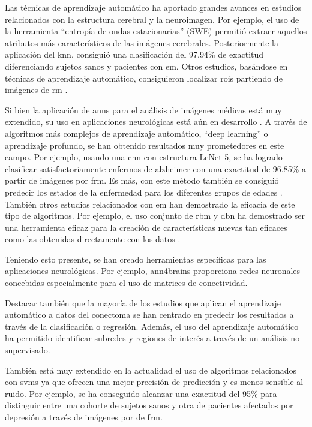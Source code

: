 Las técnicas de aprendizaje automático ha aportado grandes avances en estudios relacionados con la estructura cerebral y la neuroimagen. Por ejemplo, \cite{Zhang2016ComparisonMachine} el uso de la herramienta ``entropía de ondas estacionarias'' (SWE) permitió extraer aquellos  atributos más característicos de las imágenes cerebrales. Posteriormente la aplicación del \gls{knn}, consiguió una clasificación del 97.94\% de exactitud diferenciando sujetos sanos y pacientes con \gls{em}. Otros estudios, basándose en  técnicas de aprendizaje automático, consiguieron localizar \glspl{roi} partiendo de imágenes de \gls{rm} \cite{Desikan2006AnInterest}.

Si bien la aplicación de \glspl{ann} para el análisis de imágenes médicas está muy extendido, su uso en aplicaciones neurológicas está aún en desarrollo \cite{Ciresan2013MitosisNetworks} \cite{Ciresan2012DeepImages}. A través de algoritmos más complejos de aprendizaje automático, ``deep learning'' o aprendizaje profundo, se han obtenido resultados muy prometedores en este campo. Por ejemplo, usando una \gls{cnn} con estructura LeNet-5, se ha logrado clasificar  satisfactoriamente enfermos de alzheimer con una exactitud de 96.85\% a partir de imágenes por \gls{frm}. Es más, con este método también se consiguió predecir los estados de la enfermedad para los diferentes grupos de edades \cite{Sarraf2016ClassificationNetworks}. También otros estudios relacionados con \gls{em} han demostrado la eficacia de este tipo de algoritmos. Por ejemplo, el uso conjunto de \gls{rbm} y \gls{dbn}  ha demostrado ser una herramienta eficaz para la creación de características nuevas tan eficaces como las obtenidas directamente con los datos \cite{Yoo2014DeepSegmentation}.


Teniendo esto presente, se han creado herramientas específicas para las aplicaciones neurológicas. Por ejemplo, ann4brains \cite{Kawahara2017BrainNetCNN:Neurodevelopment} proporciona redes neuronales concebidas especialmente para el uso de matrices de conectividad. 

Destacar también que la mayoría de los estudios que aplican el aprendizaje automático a datos del conectoma se han centrado en predecir los resultados a través de la clasificación o regresión. Además, el uso del aprendizaje automático ha permitido identificar subredes y regiones de interés a través de un análisis no supervisado.

También está muy extendido en la actualidad el uso de algoritmos relacionados con \glspl{svm} \cite{HamarnehsGroup} ya que ofrecen una mejor precisión de predicción y es menos sensible al ruido. Por ejemplo, \cite{Craddock2009DiseaseConnectivity} se ha conseguido alcanzar una exactitud del 95\% para distinguir entre una cohorte de sujetos sanos y otra de pacientes afectados por depresión a través de imágenes por de \gls{frm}.

